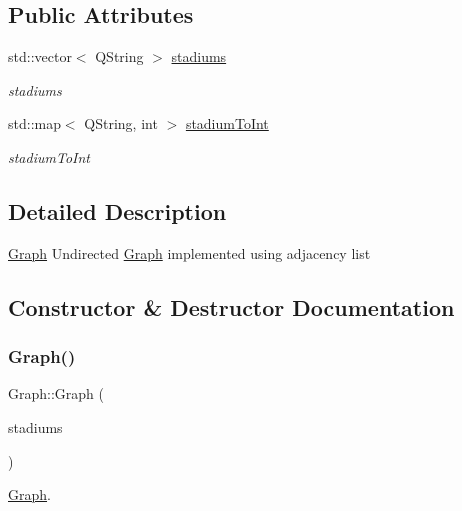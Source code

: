 \subsection*{Public Attributes}
\begin{DoxyCompactItemize}
\item 
\mbox{\label{class_graph_a90ae3fa378893d9cc43473597defbb3a}} 
std\+::vector$<$ Q\+String $>$ \hyperlink{class_graph_a90ae3fa378893d9cc43473597defbb3a}{stadiums}
\begin{DoxyCompactList}\small\item\em stadiums \end{DoxyCompactList}\item 
\mbox{\label{class_graph_ad4fcb87e949e128b64078ae7e0651363}} 
std\+::map$<$ Q\+String, int $>$ \hyperlink{class_graph_ad4fcb87e949e128b64078ae7e0651363}{stadium\+To\+Int}
\begin{DoxyCompactList}\small\item\em stadium\+To\+Int \end{DoxyCompactList}\end{DoxyCompactItemize}


\subsection{Detailed Description}
\hyperlink{class_graph}{Graph} Undirected \hyperlink{class_graph}{Graph} implemented using adjacency list 

\subsection{Constructor \& Destructor Documentation}
\mbox{\label{class_graph_a30ad544c1ac7ffca896c4f9e3482e4b2}} 
\subsubsection{\texorpdfstring{Graph()}{Graph()}}
{\footnotesize\ttfamily Graph\+::\+Graph (\begin{DoxyParamCaption}\item[{std\+::vector$<$ Q\+String $>$}]{stadiums }\end{DoxyParamCaption})}



\hyperlink{class_graph}{Graph}. 


